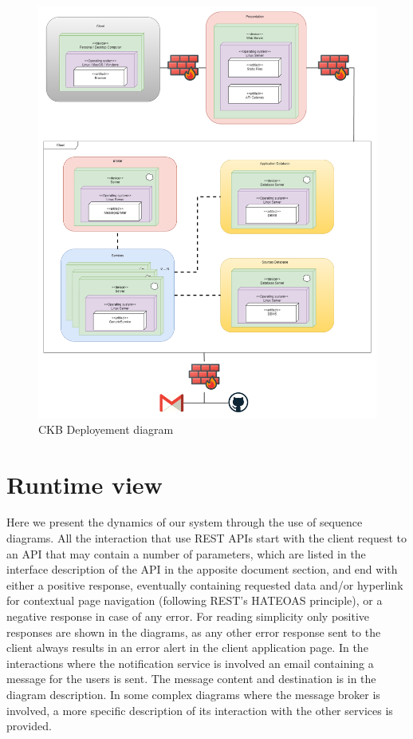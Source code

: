 \begin{figure}[H]
    \centering
    \includegraphics[width=1\linewidth]{misc//Images/Deployment.png}
    \caption{\ac{CKB} Deployement diagram}
    \label{fig:enter-label}
\end{figure}

\section{Runtime view}

Here we present the dynamics of our system through the use of sequence diagrams. All the interaction that use REST APIs start with the client request to an API that may contain a number of parameters, which are listed in the interface description of the API in the apposite document section, and end with either a positive response, eventually containing requested data and/or hyperlink for contextual page navigation (following REST's HATEOAS principle), or a negative response in case of any error.
For reading simplicity only positive responses are shown in the diagrams, as any other error response sent to the client always results in an error alert in the client application page.
In the interactions where the notification service is involved an email containing a message for the users is sent. The message content and destination is in the diagram description.
In some complex diagrams where the message broker is involved, a more specific description of its interaction with the other services is provided.

